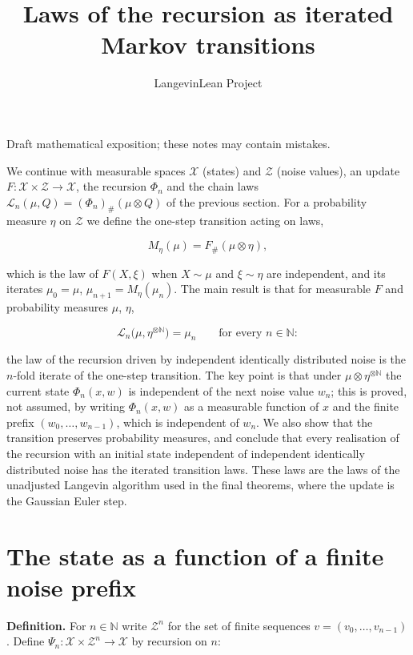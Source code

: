 \documentclass[11pt,a4paper]{article}
\title{\texorpdfstring{Laws of the recursion as iterated Markov transitions}{Laws of the recursion as iterated Markov transitions}}
\author{LangevinLean Project}
\date{}
\begin{document}
\maketitle
Draft mathematical exposition; these notes may contain mistakes.


We continue with measurable spaces \(\mathcal X\) (states) and \(\mathcal Z\) (noise values), an update \(F:\mathcal X\times\mathcal Z\to\mathcal X\), the recursion \(\Phi_n\) and the chain laws \(\mathcal L_n(\mu,Q)=(\Phi_n)_\#(\mu\otimes Q)\) of the previous section. For a probability measure \(\eta\) on \(\mathcal Z\) we define the one-step transition acting on laws,


\[M_\eta(\mu)=F_\#(\mu\otimes\eta),\]


which is the law of \(F(X,\xi)\) when \(X\sim\mu\) and \(\xi\sim\eta\) are independent, and its iterates \(\mu_0=\mu\), \(\mu_{n+1}=M_\eta(\mu_n)\). The main result is that for measurable \(F\) and probability measures \(\mu\), \(\eta\),


\[\mathcal L_n\bigl(\mu,\eta^{\otimes\mathbb N}\bigr)=\mu_n\qquad\text{for every }n\in\mathbb N:\]


the law of the recursion driven by independent identically distributed noise is the \(n\)-fold iterate of the one-step transition. The key point is that under \(\mu\otimes\eta^{\otimes\mathbb N}\) the current state \(\Phi_n(x,w)\) is independent of the next noise value \(w_n\); this is proved, not assumed, by writing \(\Phi_n(x,w)\) as a measurable function of \(x\) and the finite prefix \((w_0,\dots,w_{n-1})\), which is independent of \(w_n\). We also show that the transition preserves probability measures, and conclude that every realisation of the recursion with an initial state independent of independent identically distributed noise has the iterated transition laws. These laws are the laws of the unadjusted Langevin algorithm used in the final theorems, where the update is the Gaussian Euler step.


\section{\texorpdfstring{The state as a function of a finite noise prefix}{The state as a function of a finite noise prefix}}


\textbf{Definition.} For \(n\in\mathbb N\) write \(\mathcal Z^n\) for the set of finite sequences \(v=(v_0,\dots,v_{n-1})\). Define \(\Psi_n:\mathcal X\times\mathcal Z^n\to\mathcal X\) by recursion on \(n\):
\end{document}
